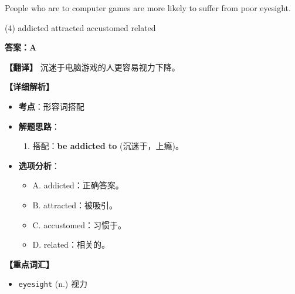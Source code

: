 \documentclass[11pt, a4paper]{article}
\newcommand{\analysis}[4]{
    \begin{solutionbox}
        \textbf{答案：#1}
        
        \textbf{【翻译】} #2
        
        \textbf{【详细解析】}
        #3
        
        \textbf{【重点词汇】}
        #4
    \end{solutionbox}
}
\newcommand{\blank}{\underline{\hspace{1.5cm}}}
\begin{document}
\begin{questions}
    \item People who are \blank to computer games are more likely to suffer from poor eyesight.
    \begin{tasks}(4)
        \task addicted \task attracted \task accustomed \task related
    \end{tasks}
    \analysis{A}{沉迷于电脑游戏的人更容易视力下降。}{
        \begin{itemize}
            \item \textbf{考点}：形容词搭配
            \item \textbf{解题思路}：
                \begin{enumerate}
                    \item 搭配：\textbf{be addicted to} (沉迷于，上瘾)。
                \end{enumerate}
            \item \textbf{选项分析}：
                \begin{itemize}
                    \item A. addicted：正确答案。
                    \item B. attracted：被吸引。
                    \item C. accustomed：习惯于。
                    \item D. related：相关的。
                \end{itemize}
        \end{itemize}
    }{
        \begin{itemize}
            \item \texttt{eyesight} (n.) 视力
        \end{itemize}
    }


\end{questions}
\end{document}

